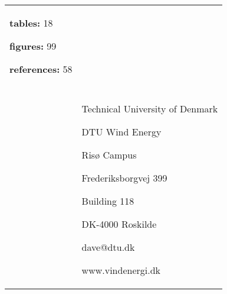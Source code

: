 \begin{table}[!htb]
\begin{tabular}{l|l}
\begin{minipage}[t]{0.42\textwidth}
\begin{flushleft}
\small \textbf{tables:} 18

\small \textbf{figures:} 99

\small \textbf{references:} 58

\end{flushleft}
\end{minipage} \\
\begin{minipage}[t]{0.57\textwidth} %
\end{minipage} 
& 
\begin{minipage}[t]{0.42\textwidth} %
\begin{flushleft}
\end{flushleft}
\end{minipage} \\ %

\begin{minipage}[b]{0.57\textwidth} %
\end{minipage} 

& 

\begin{minipage}[b]{0.42\textwidth}
\begin{flushleft}
\small Technical University of Denmark

DTU Wind Energy

Risø Campus

Frederiksborgvej 399

Building 118

DK-4000 Roskilde

dave@dtu.dk

www.vindenergi.dk
\end{flushleft}
\end{minipage} \\

\end{tabular}
\end{table}




